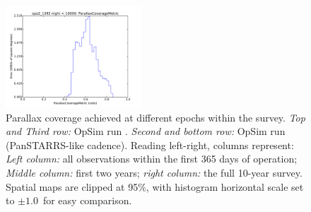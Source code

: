 \begin{figure}[ht]
\begin{center}
  \includegraphics[width=2.0in]{./figs/milkyway/MW_Astrom_paCovge_1092_10y_hst.pdf}
  \end{center}
  \caption{Parallax coverage achieved at different epochs within the survey. {\it Top and Third row:} OpSim run . {\it Second and bottom row:} OpSim run  (PanSTARRS-like cadence). Reading left-right, columns represent: {\it Left column:} all observations within the first 365 days of operation; {\it Middle column:} first two years; {\it right column:} the full 10-year survey. Spatial maps are clipped at 95\%, with histogram horizontal scale set to $\pm 1.0$~for easy comparison.}
  \label{fig_astrom_ByTime_PACoverage}
\end{figure}

